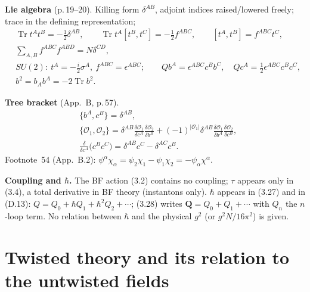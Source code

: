 \documentclass[11pt]{article}
\newcommand{\Tr}{\operatorname{Tr}}
\newcommand{\cO}{\mathcal{O}}
\newcommand{\bQ}{\mathbf{Q}}
\begin{document}
\textbf{Lie algebra} (p.\,19--20). Killing form $\delta^{AB}$, adjoint indices raised/lowered freely; trace in the defining representation;
\begin{align}
&\Tr t^At^B=-\tfrac12\delta^{AB},\qquad \Tr t^A[t^B,t^C]=-\tfrac12f^{ABC},\qquad [t^A,t^B]=f^{ABC}t^C, \tag{3.20}\\
&\textstyle\sum_{A,B}f^{ABC}f^{ABD}=N\delta^{CD}, \tag{3.21}\\
&SU(2):\ t^A=-\tfrac i2\sigma^A,\ f^{ABC}=\epsilon^{ABC};\qquad Qb^A=\epsilon^{ABC}c^Bb^C,\quad Qc^A=\tfrac12\epsilon^{ABC}c^Bc^C, \tag{3.22}\\
&b^2=b_Ab^A=-2\Tr b^2. \tag{3.23}
\end{align}

\textbf{Tree bracket} (App.~B, p.\,57).
\begin{align}
&\{b^A,c^B\}=\delta^{AB}, \tag{B.1}\\
&\{\cO_1,\cO_2\}=\delta^{AB}\frac{\delta\cO_1}{\delta c^A}\frac{\delta\cO_2}{\delta b^B}+(-1)^{|\cO_1|}\delta^{AB}\frac{\delta\cO_1}{\delta b^A}\frac{\delta\cO_2}{\delta c^B}, \tag{B.2}\\
&\frac{\delta}{\delta c^A}\big(c^Bc^C\big)=\delta^{AB}c^C-\delta^{AC}c^B. \tag{B.3}
\end{align}
Footnote~54 (App.~B.2): $\psi^\alpha\chi_\alpha=\psi_2\chi_1-\psi_1\chi_2=-\psi_\alpha\chi^\alpha$.

\textbf{Coupling and $\hbar$.} The BF action (3.2) contains no coupling; $\tau$ appears only in (3.4), a total derivative in BF theory (instantons only). $\hbar$ appears in (3.27) and in (D.13): $Q=Q_0+\hbar Q_1+\hbar^2Q_2+\cdots$; (3.28) writes $\bQ=Q_0+Q_1+\cdots$ with $Q_n$ the $n$-loop term. No relation between $\hbar$ and the physical $g^2$ (or $g^2N/16\pi^2$) is given.

\section{Twisted theory and its relation to the untwisted fields}
\end{document}
